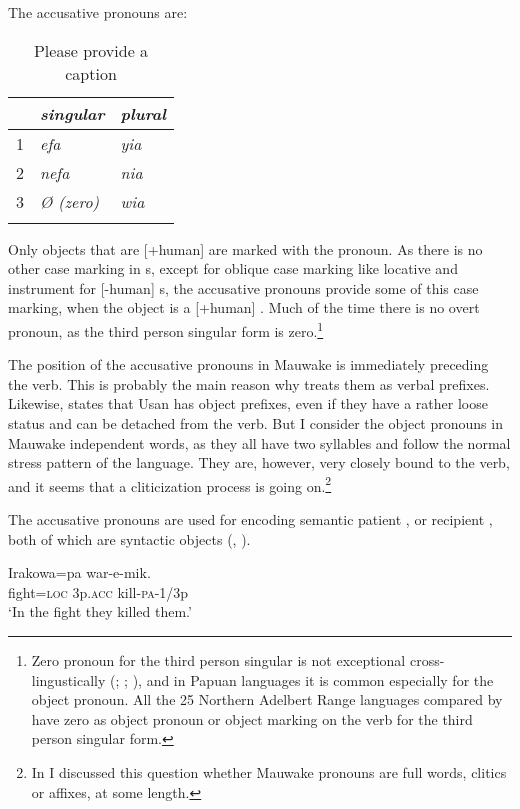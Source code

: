 The accusative pronouns are:

\begin{table}
\caption{Please provide a caption}
\label{} 
\begin{tabular}{l>{\itshape}l>{\itshape}l}
\mytoprule
 &\upshape singular &\upshape plural\\
\midrule
1 &efa &yia\\
2 &nefa &nia\\
3 &{\O} (zero) &wia\\
\mybottomrule
\end{tabular}
\end{table}


Only objects that are [+human] are marked with the pronoun. As there is no other case marking in s, except for oblique case marking like locative and instrument for [\nobreakdash-human] s, the accusative pronouns provide some of this case marking, when the object is a [+human] . Much of the time there is no overt pronoun, as the third person singular form is zero.\footnote{Zero pronoun for the third person singular is not exceptional cross-lingustically (\citealt[278]{Lyons1968}; \citealt[66]{Foley1986}; \citealt[166]{Givon1976}), and in Papuan languages it is common especially for the object pronoun. All the 25 Northern Adelbert Range languages compared by \citet[9,160]{ZGraggen1980} have zero as object pronoun or object marking on the verb for the third person singular form.} 

The position of the accusative pronouns in Mauwake is immediately preceding the verb. This is probably the main reason why \citet{ZGraggen1971} treats them as verbal prefixes. Likewise, \citet[108]{Reesink1987} states that Usan has object prefixes, even if they have a rather loose status and can be detached from the verb. But I consider the object pronouns in Mauwake independent words, as they all have two syllables and follow the normal stress pattern of the language. They are, however, very closely bound to the verb, and it seems that a cliticization process is going on.\footnote{In \citet{Jarvinen1991} I discussed this question whether Mauwake pronouns are full words, clitics or affixes, at some length.} 

The accusative pronouns are used for encoding semantic patient , or recipient , both of which are syntactic objects (, ). 

\ea%
\label{ex:3:x548}
\gll Irakowa=pa  war-e-mik. \\
fight=\textsc{loc} 3p.\textsc{acc} kill-\textsc{pa}-1/3p\\
\glt`In the fight they killed them.'
\z

